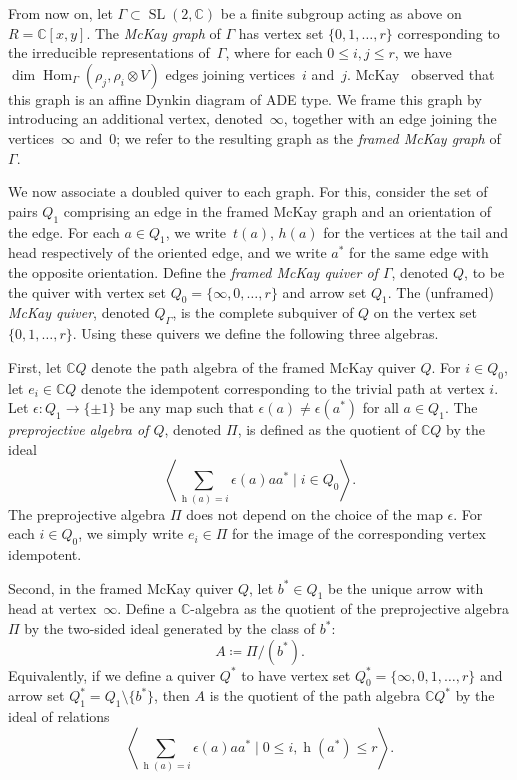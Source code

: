 \documentclass[10pt,a4paper]{amsart}
\newcommand{\SC}{\mathbb{C}} %
\newcommand{\head}{\operatorname{h}}
\newcommand{\Hom}{\operatorname{Hom}}
\newcommand{\SL}{\operatorname{SL}}
\newcommand{\PiQ}{A}
\numberwithin{equation}{section}
\begin{document}
From now on, let $\Gamma \subset \SL(2,\SC)$ be a finite subgroup acting as above on $R=\SC[x,y]$. The \emph{McKay graph} of $\Gamma$
has vertex set $\{0,1, \dots, r\}$ corresponding to the irreducible representations of~$\Gamma$, where for each $0\leq i, j\leq r$, we have $\dim\Hom_{\Gamma}(\rho_j , \rho_i \otimes V )$ edges joining vertices~$i$ and~$j$. McKay~\cite{McKay80} observed that this graph is an affine Dynkin diagram of ADE type. We frame this graph by introducing an additional vertex, denoted~$\infty$, together with an edge joining the vertices~$\infty$ and~$0$; we refer to the resulting graph as the \emph{framed McKay graph} of~$\Gamma$.

We now associate a doubled quiver to each graph. For this, consider
the set of pairs $Q_1$ comprising an edge in the framed McKay graph
and an orientation of the edge. For each $a\in Q_1$, we write~$t(a)$,
$h(a)$ for the vertices at the tail and head respectively of
the oriented edge, and we write $a^{\ast}$ for the same edge with
the opposite orientation. Define the \emph{framed McKay quiver of $\Gamma$},
denoted $Q$, to be the quiver with vertex set $Q_0= \{\infty,0,\dots ,r\}$
and arrow set $Q_1$. The (unframed) \emph{McKay quiver},
denoted $Q_\Gamma$, is the complete subquiver of $Q$ on
the vertex set $\{0, 1,\dots, r\}$. Using these quivers
we define the following three algebras.

First, let $\SC Q$ denote the path algebra of the framed McKay quiver $Q$. For $i \in Q_0$, let $e_i \in \SC Q$ denote the idempotent corresponding to the trivial path at vertex $i$. Let $\epsilon\colon Q_1 \to \{\pm 1\}$ be any map such that $\epsilon(a) \neq \epsilon(a^{\ast})$ for all $a \in Q_1$. The \emph{preprojective algebra of $Q$}, denoted $\Pi$, is defined as the quotient of $\SC Q$ by the ideal
\begin{equation}
\label{eqn:preprojectiverelation}
\left\langle \sum_{\head(a)=i} \epsilon(a) aa^{\ast} \mid {i \in Q_0}
\right\rangle.
\end{equation}
 The preprojective algebra $\Pi$ does not depend on the choice of the map $\epsilon$. For each $i\in Q_0$, we simply write $e_i\in \Pi$ for the image of the corresponding vertex idempotent.

Second, in the framed McKay quiver $Q$, let $b^*\in Q_1$ be the unique arrow with head at vertex~$\infty$. Define a $\SC$-algebra as the quotient of the preprojective algebra $\Pi$ by the two-sided ideal generated by the class of $b^*$:
 \[
 \PiQ\coloneqq \Pi/(b^*).
 \]
 Equivalently, if we define a quiver $Q^*$ to have vertex set $Q^*_0=\{\infty,0,1,\dots,r\}$ and arrow set $Q_1^*=Q_1\setminus \{b^*\}$, then $\PiQ$ is the quotient of the path algebra $\SC Q^*$ by the ideal of relations
 \begin{equation*}%
 \left\langle \sum_{\head(a) = i} \epsilon(a) aa^* \mid 0\leq i,
 \head(a^*)\leq r \right\rangle.
 \end{equation*}
\end{document}
